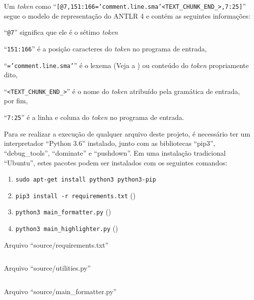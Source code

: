 Um \textit{token} como ``\texttt{[@7,151:166='comment.line.sma'<TEXT_CHUNK_END_>,7:25]}'' segue o modelo de representação do ANTLR 4 \cite{antlrBookTerrentParr} e
contém as seguintes informações:
\begin{inparaenum}[1)]
\item ``\texttt{@7}'' significa que ele é o sétimo \textit{token}
\item ``\texttt{151:166}'' é a posição caracteres do \textit{token} no programa de entrada,
\item ``\texttt{='comment.line.sma'}'' é o lexema (Veja a ) ou
conteúdo do \textit{token} propriamente dito,
\item ``\texttt{<TEXT_CHUNK_END_>}'' é o nome do \textit{token} atribuído pela gramática de entrada,
por fim,
\item ``\texttt{7:25}'' é a linha e
coluna do \textit{token} no programa de entrada.
\end{inparaenum}%

Para se realizar a execução de qualquer arquivo deste projeto,
é necessário ter um interpretador ``Python 3.6'' instalado,
junto com as bibliotecas ``pip3'',
``debug\_tools'', ``dominate'' e
``pushdown''.
Em uma instalação tradicional ``Ubuntu'',
estes pacotes podem ser instalados com os seguintes comandos:
\begin{enumerate}[1)]
\item \texttt{sudo apt-get install python3 python3-pip}
\item \texttt{pip3 install -r requirements.txt} ()
\item \texttt{python3 main_formatter.py} ()
\item \texttt{python3 main_highlighter.py} ()
\end{enumerate}

\begin{code}
\caption{Arquivo ``source/requirements.txt''}
\label{requirementsTxt}
\inputminted{python3}{../source/requirements.txt}
\end{code}

\begin{code}
\caption{Arquivo ``source/utilities.py''}
\label{utilitiesPy}
\inputminted{python3}{../source/utilities.py}
\end{code}

\begin{code}
\caption{Arquivo ``source/main\_formatter.py''}
\label{MainFormatterPy}
\inputminted{python3}{../source/main_formatter.py}
\end{code}


